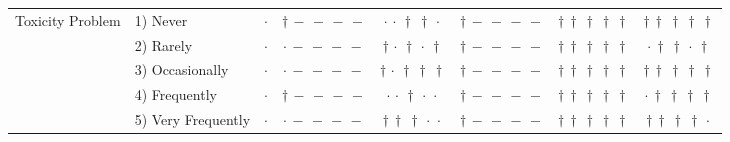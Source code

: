 {\begin{longtable}[t]{llcccccc}
\cline{1-8}
\multirow[t]{5}{*}{Toxicity Problem} & 1) Never & $\cdot$ & ${\dagger}\,{-}\,{-}\,{-}\,{-}$ & ${\cdot}\,{\cdot}\,{\dagger}\,{\dagger}\,{\cdot}$ & ${\dagger}\,{-}\,{-}\,{-}\,{-}$ & ${\dagger}\,{\dagger}\,{\dagger}\,{\dagger}\,{\dagger}$ & ${\dagger}\,{\dagger}\,{\dagger}\,{\dagger}\,{\dagger}$ \\
 & 2) Rarely & $\cdot$ & ${\cdot}\,{-}\,{-}\,{-}\,{-}$ & ${\dagger}\,{\cdot}\,{\dagger}\,{\cdot}\,{\dagger}$ & ${\dagger}\,{-}\,{-}\,{-}\,{-}$ & ${\dagger}\,{\dagger}\,{\dagger}\,{\dagger}\,{\dagger}$ & ${\cdot}\,{\dagger}\,{\dagger}\,{\cdot}\,{\dagger}$ \\
 & 3) Occasionally & $\cdot$ & ${\cdot}\,{-}\,{-}\,{-}\,{-}$ & ${\dagger}\,{\cdot}\,{\dagger}\,{\dagger}\,{\dagger}$ & ${\dagger}\,{-}\,{-}\,{-}\,{-}$ & ${\dagger}\,{\dagger}\,{\dagger}\,{\dagger}\,{\dagger}$ & ${\dagger}\,{\dagger}\,{\dagger}\,{\dagger}\,{\dagger}$ \\
 & 4) Frequently & $\cdot$ & ${\dagger}\,{-}\,{-}\,{-}\,{-}$ & ${\cdot}\,{\cdot}\,{\dagger}\,{\cdot}\,{\cdot}$ & ${\dagger}\,{-}\,{-}\,{-}\,{-}$ & ${\dagger}\,{\dagger}\,{\dagger}\,{\dagger}\,{\dagger}$ & ${\cdot}\,{\dagger}\,{\dagger}\,{\dagger}\,{\dagger}$ \\
 & 5) Very Frequently & $\cdot$ & ${\cdot}\,{-}\,{-}\,{-}\,{-}$ & ${\dagger}\,{\dagger}\,{\dagger}\,{\cdot}\,{\cdot}$ & ${\dagger}\,{-}\,{-}\,{-}\,{-}$ & ${\dagger}\,{\dagger}\,{\dagger}\,{\dagger}\,{\dagger}$ & ${\dagger}\,{\dagger}\,{\dagger}\,{\dagger}\,{\cdot}$ \\
\cline{1-8}
\end{longtable}
}
